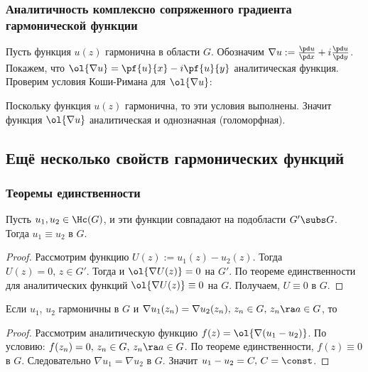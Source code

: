 \documentclass[a4paper]{article}
\begin{document}
\begin{theorem}
\subsubsection{Аналитичность комплексно сопряженного градиента гармонической функции}

Пусть функция $u(z)$ гармонична в области $G$. Обозначим
$\nabla u :=\frac{\pd u}{\pd x}+i\frac{\pd u}{\pd y}$.
Покажем, что $\ol{\nabla u}=\pf{u}{x}-i \pf{u}{y}$ аналитическая функция.
Проверим условия Коши-Римана для $\ol{\nabla u}$:

Поскольку функция $u(z)$ гармонична, то эти условия выполнены. Значит функция $\ol{\nabla u}$
аналитическая и однозначная (голоморфная).

\subsection{Ещё несколько свойств гармонических функций}

\subsubsection{Теоремы единственности}

\begin{theorem}[1]
Пусть $u_1,u_2\in \Hc(G)$, и эти функции совпадают на подобласти $G'\subs G$. Тогда $u_1\equiv u_2$ в $G$.
\end{theorem}
\begin{proof}
Рассмотрим функцию $U(z) :=u_1(z)-u_2(z)$. Тогда $U(z)=0,\,z\in G'$. Тогда и
$\ol{\nabla U(z)}=0$ на $G'$. По теореме единственности для аналитических функций
$\ol{\nabla U(z)}\equiv 0$ на $G$. Получаем, $U\equiv0$ в $G$.
\end{proof}

\begin{theorem}[2]
 Если $u_1$, $u_2$ гармоничны в $G$ и
$\nabla u_1(z_n)=\nabla u_2(z_n), \, z_n\in G,\,z_n\ra a\in G$, то
\end{theorem}

\begin{proof}
Рассмотрим аналитическую функцию $f(z)=\ol{\nabla(u_1-u_2)}$. По условию: $f(z_n)=0,\,z_n\in
G,\,z_n\ra a\in G$. По теореме единственности, $f(z)\equiv0$ в $G$. Следовательно $\nabla
u_1=\nabla u_2$ в $G$. Значит $u_1-u_2=C,\,C=\const$.
\end{proof}


\end{theorem}
\end{document}
